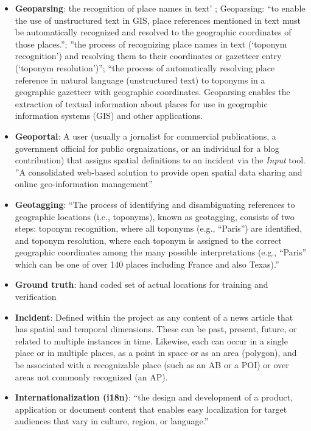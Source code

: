 \begin{itemize}
	\item[] \textbf{Geoparsing}: {\color{orange} the recognition of place names in text' \cite{Silva2006}}; {Geoparsing: “to enable the use of unstructured text in GIS, place references mentioned in text must be automatically recognized and resolved to the geographic coordinates of those places.”\cite{Karimzadeh2019a}}; {\color{orange}''the process of recognizing place names in text (‘toponym recognition’) and resolving them to their coordinates or gazetteer entry (‘toponym resolution’)''\cite{Halterma2019}}; {\color{orange}“the process of automatically resolving place reference in natural language (unstructured text) to toponyms in a geographic gazetteer with geographic coordinates. Geoparsing enables the extraction of textual information about places for use in geographic information systems (GIS) and other applications.\cite{Karimzadeh2019}}
	\item[] \textbf{Geoportal}: {\color{red} A user (usually a jornalist for commercial publications, a government official for public orgnaizations, or an individual for a blog contribution) that assigns spatial definitions to an incident via the \textit{Input} tool}. {\color{orange}''A consolidated web-based solution to provide open spatial data sharing and online geo-information management''\cite{Jiang2020}}\\
	\item[] \textbf{Geotagging}: {``The process of identifying and disambiguating references to geographic locations (i.e., toponyms), known as geotagging, consists of two steps: toponym recognition, where all toponyms (e.g., “Paris”) are identified, and toponym resolution, where each toponym is assigned to the correct geographic coordinates among the many possible interpretations (e.g., “Paris” which can be one of over 140 places including France and also Texas).'' \cite{Lieberman2010}}
	\item[] \textbf{Ground truth}: {hand coded set of actual locations for training and verification\cite{Lee2019}}
	\item[] \textbf{Incident}: Defined within the project as any content of a news article that has spatial and temporal dimensions.  These can be past, present, future, or related to multiple instances in time. Likewise, each can occur in a single place or in multiple places, as a point in space or as an area (polygon), and be associated with a recognizable place (such as an AB or a POI) or over areas not commonly recognized (an AP).
	\item[] \textbf{Internationalization (i18n)}: {``the design and development of a product, application or document content that enables easy localization for target audiences that vary in culture, region, or language.'' \cite{Ishida2005}}

\end{itemize}
